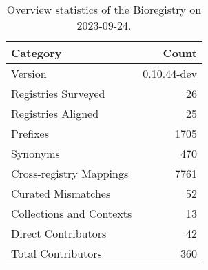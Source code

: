 \begin{table}
\caption{Overview statistics of the Bioregistry on 2023-09-24.}
\label{tab:bioregistry-summary}
\begin{tabular}{lr}
\toprule
Category & Count \\
\midrule
Version & 0.10.44-dev \\
Registries Surveyed & 26 \\
Registries Aligned & 25 \\
Prefixes & 1705 \\
Synonyms & 470 \\
Cross-registry Mappings & 7761 \\
Curated Mismatches & 52 \\
Collections and Contexts & 13 \\
Direct Contributors & 42 \\
Total Contributors & 360 \\
\bottomrule
\end{tabular}
\end{table}
